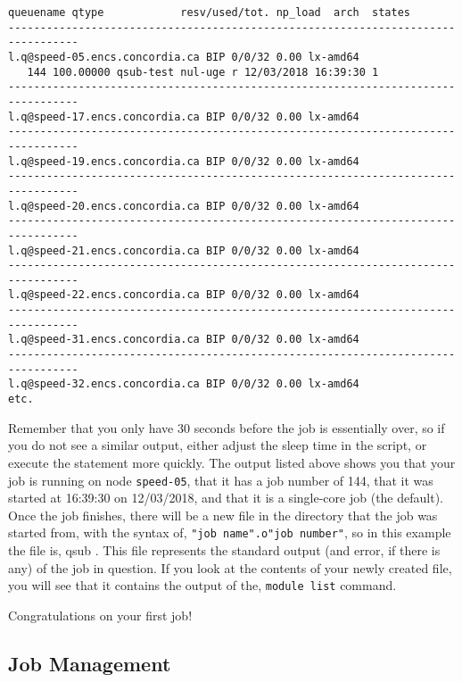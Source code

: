 \documentclass{easychair}
\begin{document}
\small
\begin{verbatim}
queuename qtype            resv/used/tot. np_load  arch  states
--------------------------------------------------------------------------------- 
l.q@speed-05.encs.concordia.ca BIP 0/0/32 0.00 lx-amd64
   144 100.00000 qsub-test nul-uge r 12/03/2018 16:39:30 1 
--------------------------------------------------------------------------------- 
l.q@speed-17.encs.concordia.ca BIP 0/0/32 0.00 lx-amd64  
--------------------------------------------------------------------------------- 
l.q@speed-19.encs.concordia.ca BIP 0/0/32 0.00 lx-amd64  
--------------------------------------------------------------------------------- 
l.q@speed-20.encs.concordia.ca BIP 0/0/32 0.00 lx-amd64  
--------------------------------------------------------------------------------- 
l.q@speed-21.encs.concordia.ca BIP 0/0/32 0.00 lx-amd64  
--------------------------------------------------------------------------------- 
l.q@speed-22.encs.concordia.ca BIP 0/0/32 0.00 lx-amd64  
--------------------------------------------------------------------------------- 
l.q@speed-31.encs.concordia.ca BIP 0/0/32 0.00 lx-amd64  
--------------------------------------------------------------------------------- 
l.q@speed-32.encs.concordia.ca BIP 0/0/32 0.00 lx-amd64  
etc.
\end{verbatim}
\normalsize

Remember that you only have 30 seconds before the job is essentially over, so if you do not see a similar output, either adjust the sleep time in the script, or execute the  statement more quickly. The  output listed above shows you that your job is 
running on node \texttt{speed-05}, that it has a job number of 144, that it was started at 16:39:30 on 12/03/2018, and that it is a single-core job (the default).  
Once the job finishes, there will be a new file in the directory that the job was started  from, with the syntax of, \texttt{"job name".o"job number"}, so in this example the file is, qsub . This file represents the standard output (and error, if there is any) of the job in question. If you look at the contents of your newly created file, you will see that it  contains the output of the, \texttt{module list} command. 

Congratulations on your first job! 

\subsection{Job Management}
\end{document}
